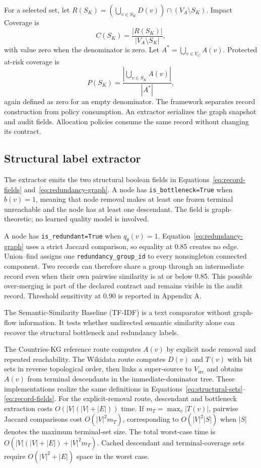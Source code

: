 \documentclass[pdflatex,sn-basic]{sn-jnl}
\begin{document}
For a selected set, let $R(S_K)=(\bigcup_{v\in S_K}D(v))\cap(V_A\setminus S_K)$. Impact Coverage is
\begin{equation}
C(S_K)=\frac{|R(S_K)|}{|V_A\setminus S_K|},
\end{equation}
with value zero when the denominator is zero. Let $A^*=\bigcup_{v\in V_C}A(v)$. Protected at-risk coverage is
\begin{equation}
P(S_K)=\frac{|\bigcup_{v\in S_K}A(v)|}{|A^*|},
\end{equation}
again defined as zero for an empty denominator. The framework separates record construction from policy consumption. An extractor serializes the graph snapshot and audit fields. Allocation policies consume the same record without changing its contract.

\subsection{Structural label extractor}

The extractor emits the two structural boolean fields in Equations~\ref{eq:record-fields} and~\ref{eq:redundancy-graph}. A node has \texttt{is\_bottleneck=True} when $b(v)=1$, meaning that node removal makes at least one frozen terminal unreachable and the node has at least one descendant. The field is graph-theoretic; no learned quality model is involved.

A node has \texttt{is\_redundant=True} when $q_{\theta}(v)=1$. Equation~\ref{eq:redundancy-graph} uses a strict Jaccard comparison, so equality at 0.85 creates no edge. Union--find assigns one \texttt{redundancy\_group\_id} to every nonsingleton connected component. Two records can therefore share a group through an intermediate record even when their own pairwise similarity is at or below 0.85. This possible over-merging is part of the declared contract and remains visible in the audit record. Threshold sensitivity at 0.90 is reported in Appendix A.

The Semantic-Similarity Baseline (TF-IDF) is a text comparator without graph-flow information. It tests whether undirected semantic similarity alone can recover the structural bottleneck and redundancy labels.

The Countries-KG reference route computes $A(v)$ by explicit node removal and repeated reachability. The Wikidata route computes $D(v)$ and $T(v)$ with bit sets in reverse topological order, then links a super-source to $V_{\mathrm{src}}$ and obtains $A(v)$ from terminal descendants in the immediate-dominator tree. These implementations realize the same definitions in Equations~\ref{eq:structural-sets}--\ref{eq:record-fields}. For the explicit-removal route, descendant and bottleneck extraction costs $O(|V|(|V|+|E|))$ time. If $m_T=\max_v|T(v)|$, pairwise Jaccard comparisons cost $O(|V|^2m_T)$, corresponding to $O(|V|^2|S|)$ when $|S|$ denotes the maximum terminal-set size. The total worst-case time is $O(|V|(|V|+|E|)+|V|^2m_T)$. Cached descendant and terminal-coverage sets require $O(|V|^2+|E|)$ space in the worst case.
\end{document}
